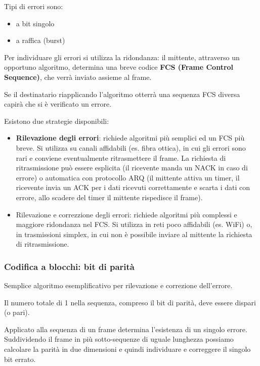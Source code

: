         Tipi di errori sono:
        \begin{itemize}
            \item a bit singolo
            \item a raffica (burst)
        \end{itemize}

        Per individuare gli errori si utilizza la ridondanza: il mittente, attraverso un opportuno algoritmo, determina una breve codice \textbf{FCS (Frame Control Sequence)}, che verrà inviato assieme al frame.
        
        Se il destinatario riapplicando l'algoritmo otterrà una sequenza FCS diversa capirà che si è verificato un errore.

        Esistono due strategie disponibili:
        \begin{itemize}
            \item \textbf{Rilevazione degli errori}: richiede algoritmi più semplici ed un FCS più breve. Si utilizza su canali affidabili (es. fibra ottica), in cui gli errori sono rari e conviene eventualmente ritrasmettere il frame. La richiesta di ritrasmissione può essere esplicita (il ricevente manda un NACK in caso di errore) o automatica con protocollo ARQ (il mittente attiva un timer, il ricevente invia un ACK per i dati ricevuti correttamente e scarta i dati con errore, allo scadere del timer il mittente rispedisce il frame).
            \item Rilevazione e correzzione degli errori: richiede algoritmi più complessi e maggiore ridondanza nel FCS. Si utilizza in reti poco affidabili (es. WiFi) o, in trasmissioni simplex, in cui non è possibile inviare al mittente la richiesta di ritrasmissione.
        \end{itemize}

        \subsubsection{Codifica a blocchi: bit di parità}
            Semplice algoritmo esemplificativo per rilevazione e correzione dell'errore.
        
            Il numero totale di 1 nella sequenza, compreso il bit di parità, deve essere dispari (o pari).

            Applicato alla sequenza di un frame determina l'esistenza di un singolo errore. Suddividendo il frame in più sotto-sequenze di uguale lunghezza possiamo calcolare la parità in due dimensioni e quindi individuare e correggere il singolo bit errato.
            
